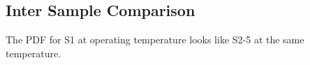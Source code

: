\subsection{Inter Sample Comparison}

The PDF for S1 at operating temperature looks like S2-5 at the same temperature.
